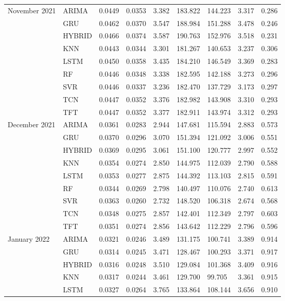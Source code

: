 \begin{tabular}{lllllllll}
November 2021 & ARIMA & 0.0449 & 0.0353 & 3.382 & 183.822 & 144.223 & 3.317 & 0.286 \\
 & GRU & 0.0462 & 0.0370 & 3.547 & 188.984 & 151.288 & 3.478 & 0.246 \\
 & HYBRID & 0.0466 & 0.0374 & 3.587 & 190.763 & 152.976 & 3.518 & 0.231 \\
 & KNN & 0.0443 & 0.0344 & 3.301 & 181.267 & 140.653 & 3.237 & 0.306 \\
 & LSTM & 0.0450 & 0.0358 & 3.435 & 184.210 & 146.549 & 3.369 & 0.283 \\
 & RF & 0.0446 & 0.0348 & 3.338 & 182.595 & 142.188 & 3.273 & 0.296 \\
 & SVR & 0.0446 & 0.0337 & 3.236 & 182.470 & 137.729 & 3.173 & 0.297 \\
 & TCN & 0.0447 & 0.0352 & 3.376 & 182.982 & 143.908 & 3.310 & 0.293 \\
 & TFT & 0.0447 & 0.0352 & 3.377 & 182.911 & 143.974 & 3.312 & 0.293 \\
December 2021 & ARIMA & 0.0361 & 0.0283 & 2.944 & 147.681 & 115.594 & 2.883 & 0.573 \\
 & GRU & 0.0370 & 0.0296 & 3.070 & 151.394 & 121.092 & 3.006 & 0.551 \\
 & HYBRID & 0.0369 & 0.0295 & 3.061 & 151.100 & 120.777 & 2.997 & 0.552 \\
 & KNN & 0.0354 & 0.0274 & 2.850 & 144.975 & 112.039 & 2.790 & 0.588 \\
 & LSTM & 0.0353 & 0.0277 & 2.875 & 144.392 & 113.103 & 2.815 & 0.591 \\
 & RF & 0.0344 & 0.0269 & 2.798 & 140.497 & 110.076 & 2.740 & 0.613 \\
 & SVR & 0.0363 & 0.0260 & 2.732 & 148.520 & 106.318 & 2.674 & 0.568 \\
 & TCN & 0.0348 & 0.0275 & 2.857 & 142.401 & 112.349 & 2.797 & 0.603 \\
 & TFT & 0.0351 & 0.0274 & 2.856 & 143.642 & 112.229 & 2.796 & 0.596 \\
January 2022 & ARIMA & 0.0321 & 0.0246 & 3.489 & 131.175 & 100.741 & 3.389 & 0.914 \\
 & GRU & 0.0314 & 0.0245 & 3.471 & 128.467 & 100.293 & 3.371 & 0.917 \\
 & HYBRID & 0.0316 & 0.0248 & 3.510 & 129.084 & 101.368 & 3.409 & 0.916 \\
 & KNN & 0.0317 & 0.0244 & 3.461 & 129.700 & 99.705 & 3.361 & 0.915 \\
 & LSTM & 0.0327 & 0.0264 & 3.765 & 133.864 & 108.144 & 3.656 & 0.910 \\

\end{tabular}

